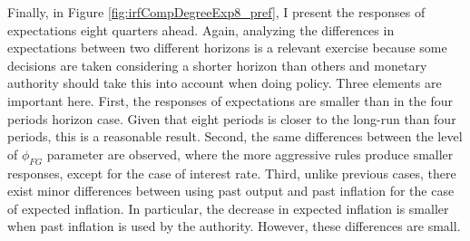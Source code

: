 \documentclass[12pt]{article}
\numberwithin{equation}{section}
\begin{document}
Finally, in Figure \ref{fig:irfCompDegreeExp8_pref}, I present the responses of expectations eight quarters ahead. Again, analyzing the differences in expectations between two different horizons is a relevant exercise because some decisions are taken considering a shorter horizon than others and monetary authority should take this into account when doing policy. Three elements are important here. First, the responses of expectations are smaller than in the four periods horizon case. Given that eight periods is closer to the long-run than four periods, this is a reasonable result. Second, the same differences between the level of $\phi_{FG}$ parameter are observed, where the more aggressive rules produce smaller responses, except for the case of interest rate. Third, unlike previous cases, there exist minor differences between using past output and past inflation for the case of expected inflation. In particular, the decrease in expected inflation is smaller when past inflation is used by the authority. However, these differences are small.

\end{document}
